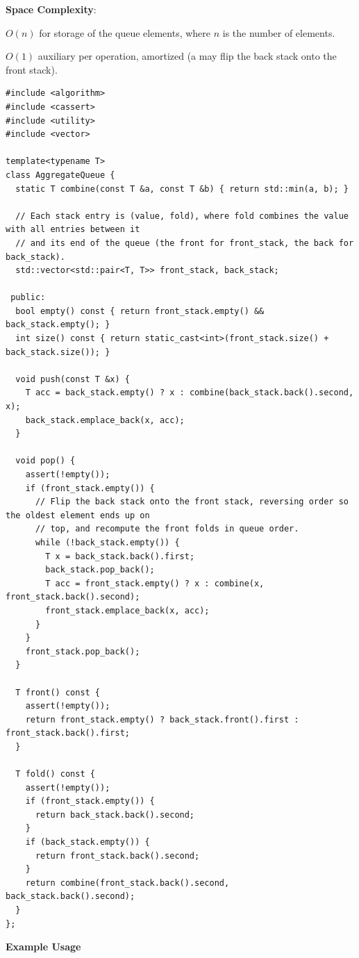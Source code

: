 \textbf{Space Complexity}:
\begin{compactitem}
  \item $O(n)$ for storage of the queue elements, where $n$ is the number of elements.
  \item $O(1)$ auxiliary per operation, amortized (a  may flip the back stack onto the front stack).
\end{compactitem}

\begin{lstlisting}[style=cpp]
#include <algorithm>
#include <cassert>
#include <utility>
#include <vector>

template<typename T>
class AggregateQueue {
  static T combine(const T &a, const T &b) { return std::min(a, b); }

  // Each stack entry is (value, fold), where fold combines the value with all entries between it
  // and its end of the queue (the front for front_stack, the back for back_stack).
  std::vector<std::pair<T, T>> front_stack, back_stack;

 public:
  bool empty() const { return front_stack.empty() && back_stack.empty(); }
  int size() const { return static_cast<int>(front_stack.size() + back_stack.size()); }

  void push(const T &x) {
    T acc = back_stack.empty() ? x : combine(back_stack.back().second, x);
    back_stack.emplace_back(x, acc);
  }

  void pop() {
    assert(!empty());
    if (front_stack.empty()) {
      // Flip the back stack onto the front stack, reversing order so the oldest element ends up on
      // top, and recompute the front folds in queue order.
      while (!back_stack.empty()) {
        T x = back_stack.back().first;
        back_stack.pop_back();
        T acc = front_stack.empty() ? x : combine(x, front_stack.back().second);
        front_stack.emplace_back(x, acc);
      }
    }
    front_stack.pop_back();
  }

  T front() const {
    assert(!empty());
    return front_stack.empty() ? back_stack.front().first : front_stack.back().first;
  }

  T fold() const {
    assert(!empty());
    if (front_stack.empty()) {
      return back_stack.back().second;
    }
    if (back_stack.empty()) {
      return front_stack.back().second;
    }
    return combine(front_stack.back().second, back_stack.back().second);
  }
};
\end{lstlisting}
\textbf{Example Usage}\par
